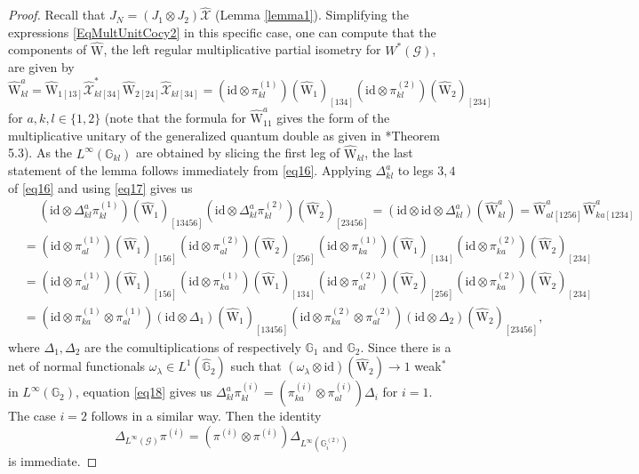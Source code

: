 \documentclass[reqno]{amsart}
\numberwithin{equation}{section}
\newcommand{\id}{\mathrm{id}}
\newcommand{\G}{\mathbb{G}}
\newcommand{\msG}{\mathscr{G}}
\newcommand{\mcX}{\mathcal{X}}
\newcommand{\mc}{\mathcal}
\newcommand{\wh}{\widehat}
\newcommand{\ww}{\mathrm{W}}
\begin{document}
\begin{proof}
Recall that $J_N=(J_1\otimes J_2)\wh{\mc{X}}$ (Lemma \ref{lemma1}). Simplifying the expressions \eqref{EqMultUnitCocy2} in this specific case, one can compute that the components of $\hat{\ww}$, the left regular multiplicative partial isometry for $W^*(\msG)$, are given by
\begin{equation}
\label{eq16}
\hat{\ww}_{kl}^a = \hat{\ww}_{1[13]}\wh{\mcX}_{kl[34]}^*\hat{\ww}_{2[24]}\wh{\mc{X}}_{kl[34]}=
(\id\otimes \pi^{(1)}_{kl})(\hat{\ww}_{1})_{[134]}
(\id\otimes \pi^{(2)}_{kl})(\hat{\ww}_{2})_{[234]}
\end{equation}
for $a,k,l\in\{1,2\}$ (note that the formula for $\hat{\ww}^a_{11}$ gives the form of the multiplicative unitary of the generalized quantum double as given in  \cite{BV05}*{Theorem 5.3}). As the $L^{\infty}(\G_{kl})$ are obtained by slicing the first leg of $\hat{\ww}_{kl}$, the last statement of the lemma follows immediately from \eqref{eq16}. Applying $\Delta_{kl}^a$ to legs $3,4$ of \eqref{eq16} and using \eqref{eq17} gives us
\begin{equation}\begin{split}\label{eq18}
&\quad\;
(\id\otimes \Delta^a_{kl}\pi^{(1)}_{kl})(\hat{\ww}_{1})_{[13456]}
(\id\otimes \Delta^a_{kl}\pi^{(2)}_{kl})(\hat{\ww}_{2})_{[23456]}
=
(\id\otimes\id\otimes \Delta^a_{kl})(\hat{\ww}^a_{kl})=
\hat{\ww}^a_{al [1256]} \hat{\ww}^a_{ka [1234]}\\
&=
(\id\otimes \pi^{(1)}_{al})(\hat{\ww}_{1})_{[156]}
(\id\otimes \pi^{(2)}_{al})(\hat{\ww}_{2})_{[256]}
(\id\otimes \pi^{(1)}_{ka})(\hat{\ww}_{1})_{[134]}
(\id\otimes \pi^{(2)}_{ka})(\hat{\ww}_{2})_{[234]}\\
&=
(\id\otimes \pi^{(1)}_{al})(\hat{\ww}_{1})_{[156]}
(\id\otimes \pi^{(1)}_{ka})(\hat{\ww}_{1})_{[134]}
(\id\otimes \pi^{(2)}_{al})(\hat{\ww}_{2})_{[256]}
(\id\otimes \pi^{(2)}_{ka})(\hat{\ww}_{2})_{[234]}\\
&=
(\id\otimes \pi^{(1)}_{ka}\otimes\pi^{(1)}_{al})(\id\otimes \Delta_1)(\hat{\ww}_{1})_{[13456]}
(\id\otimes \pi^{(2)}_{ka}\otimes \pi^{(2)}_{al})
(\id\otimes \Delta_2)(\hat{\ww}_{2})_{[23456]},
\end{split}\end{equation}
where $\Delta_1,\Delta_2$ are the comultiplications of respectively $\G_1$ and $\G_2$. Since there is a net of normal functionals $\omega_\lambda\in L^1(\hat{\G}_2)$ such that $(\omega_\lambda\otimes\id)(\hat{\ww}_2)\to 1$ weak$^*$ in $L^{\infty}(\G_2)$, equation \eqref{eq18} gives us $\Delta^a_{kl}\pi^{(i)}_{kl}=(\pi^{(i)}_{ka}\otimes \pi^{(i)}_{al})\Delta_i$ for $i=1$. The case $i=2$ follows in a similar way. Then the identity 
\[
\Delta_{L^{\infty}(\msG)}\pi^{(i)}=
(\pi^{(i)}\otimes \pi^{(i)})\Delta_{L^{\infty}(\G_i^{(2)})}
\] 
is immediate.
\end{proof}
\end{document}
